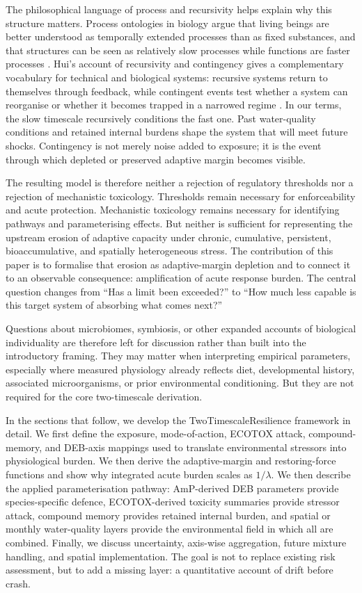 The philosophical language of process and recursivity helps explain why this structure matters. Process ontologies in biology argue that living beings are better understood as temporally extended processes than as fixed substances, and that structures can be seen as relatively slow processes while functions are faster processes \citep{dupre2015process}. Hui's account of recursivity and contingency gives a complementary vocabulary for technical and biological systems: recursive systems return to themselves through feedback, while contingent events test whether a system can reorganise or whether it becomes trapped in a narrowed regime \citep{hui2019recursivity}. In our terms, the slow timescale recursively conditions the fast one. Past water-quality conditions and retained internal burdens shape the system that will meet future shocks. Contingency is not merely noise added to exposure; it is the event through which depleted or preserved adaptive margin becomes visible.

The resulting model is therefore neither a rejection of regulatory thresholds nor a rejection of mechanistic toxicology. Thresholds remain necessary for enforceability and acute protection. Mechanistic toxicology remains necessary for identifying pathways and parameterising effects. But neither is sufficient for representing the upstream erosion of adaptive capacity under chronic, cumulative, persistent, bioaccumulative, and spatially heterogeneous stress. The contribution of this paper is to formalise that erosion as adaptive-margin depletion and to connect it to an observable consequence: amplification of acute response burden. The central question changes from ``Has a limit been exceeded?'' to ``How much less capable is this target system of absorbing what comes next?''

Questions about microbiomes, symbiosis, or other expanded accounts of biological individuality are therefore left for discussion rather than built into the introductory framing. They may matter when interpreting empirical parameters, especially where measured physiology already reflects diet, developmental history, associated microorganisms, or prior environmental conditioning. But they are not required for the core two-timescale derivation.

In the sections that follow, we develop the TwoTimescaleResilience framework in detail. We first define the exposure, mode-of-action, ECOTOX attack, compound-memory, and DEB-axis mappings used to translate environmental stressors into physiological burden. We then derive the adaptive-margin and restoring-force functions and show why integrated acute burden scales as $1/\lambda$. We then describe the applied parameterisation pathway: AmP-derived DEB parameters provide species-specific defence, ECOTOX-derived toxicity summaries provide stressor attack, compound memory provides retained internal burden, and spatial or monthly water-quality layers provide the environmental field in which all are combined. Finally, we discuss uncertainty, axis-wise aggregation, future mixture handling, and spatial implementation. The goal is not to replace existing risk assessment, but to add a missing layer: a quantitative account of drift before crash.

